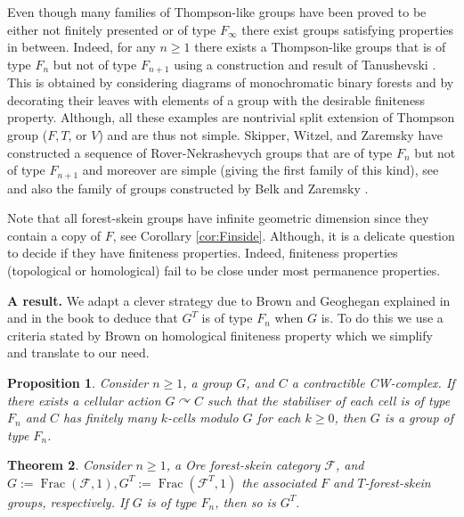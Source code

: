 \documentclass[a4paper, 12pt]{amsart}
\numberwithin{equation}{section}
\newtheorem{theorem}{Theorem}[section]
\newtheorem{proposition}[theorem]{Proposition}
\theoremstyle{definition}
\newcommand{\act}{\curvearrowright}
\newcommand{\cF}{\mathcal F}
\DeclareMathOperator{\Frac}{Frac}
\begin{document}
Even though many families of Thompson-like groups have been proved to be either not finitely presented or of type $F_\infty$ there exist groups satisfying properties in between.
Indeed, for any $n\geq 1$ there exists a Thompson-like groups that is of type $F_n$ but not of type $F_{n+1}$ using a construction and result of Tanushevski \cite{Tanushevski16}.
This is obtained by considering diagrams of monochromatic binary forests and by decorating their leaves with elements of a group with the desirable finiteness property.
Although, all these examples are nontrivial split extension of Thompson group ($F,T$, or $V$) and are thus not simple.
Skipper, Witzel, and Zaremsky have constructed a sequence of Rover-Nekrashevych groups that are of type $F_n$ but not of type $F_{n+1}$ and moreover are simple (giving the first family of this kind), see \cite{Skipper-Witzel-Zaremsky19} and also the family of groups constructed by Belk and Zaremsky \cite{Belk-Zaremsky22}.

Note that all forest-skein groups have infinite geometric dimension since they contain a copy of $F$, see Corollary \ref{cor:Finside}. 
Although, it is a delicate question to decide if they have finiteness properties.
Indeed, finiteness properties (topological or homological) fail to be close under most permanence properties. 

{\bf A result.}
We adapt a clever strategy due to Brown and Geoghegan explained in \cite[Section 4B, Remark 2]{Brown87} and in the book \cite[Theorem 9.4.2]{Geoghegan-book} to deduce that $G^T$ is of type $F_n$ when $G$ is. 
To do this we use a criteria stated by Brown \cite[Proposition 1.1]{Brown87} on homological finiteness property which we simplify and translate to our need.

\begin{proposition}\label{prop:stab-F-infty}
Consider $n\geq 1$, a group $G$, and $C$ a contractible CW-complex.
If there exists a cellular action $G\act C$ such that the stabiliser of each cell is of type $F_n$ and $C$ has finitely many $k$-cells modulo $G$ for each $k\geq 0$, then $G$ is a group of type $F_n$.
\end{proposition}

\begin{theorem}\label{theo:T-F-infty}
Consider $n\geq 1$, a Ore forest-skein category $\cF$, and $G:=\Frac(\cF,1), G^T:=\Frac(\cF^T,1)$ the associated $F$ and $T$-forest-skein groups, respectively.
If $G$ is of type $F_n$, then so is $G^T.$
\end{theorem}
\end{document}
